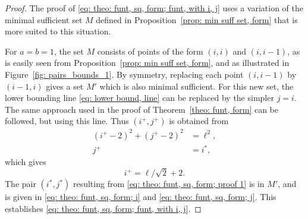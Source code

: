 \documentclass[12pt, a4paper]{article}
\newcommand{\len}{\ell} %
\newcommand{\isolr}{i^+}
\newcommand{\jsolr}{j^+}
\newcommand{\isoli}{i^\ast}
\newcommand{\jsoli}{j^\ast}
\newcommand{\mss}{M}
\begin{document}
\begin{proof}
The proof of \eqref{eq: theo: funt, sq, form; funt, with i, j} uses a variation of the minimal sufficient set $\mss$ defined in Proposition~\ref{prop: min suff set, form} that is more suited to this situation.

For $a=b=1$, the set $\mss$ consists of points of the form $(i,i)$ and $(i,i-1)$, as is easily seen from Proposition~\ref{prop: min suff set, form}, and as illustrated in Figure~\ref{fig: pairs_bounds_1}. By symmetry, replacing each point $(i,i-1)$ by $(i-1,i)$ gives a set $\mss'$ which is also minimal sufficient. For this new set, the lower bounding line \eqref{eq: lower bound, line} can be replaced by the simpler $j=i$. The same approach used in the proof of Theorem~\ref{theo: funt, form} can be followed, but using this line. Thus $(\isolr, \jsolr)$ is obtained from
\begin{align}
(\isolr-2)^2 + (\jsolr-2)^2  &= \len^2, \\
\jsolr &= \isoli,
\end{align}
which gives
\begin{equation}
\label{eq: theo: funt, sq, form; proof 1}
\isolr = \len/\sqrt{2} + 2.
\end{equation}
The pair $(\isoli,\jsoli)$ resulting from \eqref{eq: theo: funt, sq, form; proof 1} is in $\mss'$, and is given in \eqref{eq: theo: funt, sq, form; i} and \eqref{eq: theo: funt, sq, form; j}. This establishes \eqref{eq: theo: funt, sq, form; funt, with i, j}.


\end{proof}
\end{document}
